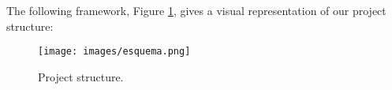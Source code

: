 \documentclass[a4paper,10pt]{book}
\begin{document}
The following framework, Figure \ref{fig:projectStructure}, gives a visual representation of our project structure:

\begin{figure}[h]
    \centering
    \texttt{[image: images/esquema.png]}
    \caption{Project structure.}
    \label{fig:projectStructure}
\end{figure}  

  
  
  
  
\end{document}
